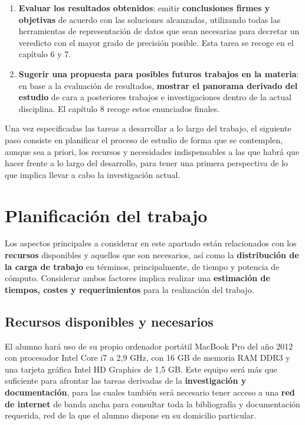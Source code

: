 \begin{enumerate}
	\item  \label{tarea6} \textbf{Evaluar los resultados obtenidos}: emitir \textbf{conclusiones firmes y objetivas} de acuerdo con las soluciones alcanzadas, utilizando todas las herramientas de representación de datos que sean necesarias para decretar un veredicto con el mayor grado de precisión posible. Esta tarea se recoge en el capítulo 6 y 7.
	
	\item  \label{tarea7} \textbf{Sugerir una propuesta para posibles futuros trabajos en la materia}: en base a la evaluación de resultados, \textbf{mostrar el panorama derivado del estudio} de cara a posteriores trabajos e investigaciones dentro de la actual disciplina. El capítulo 8 recoge estos enunciados finales.
\end{enumerate}

Una vez especificadas las tareas a desarrollar a lo largo del trabajo, el siguiente paso consiste en planificar el proceso de estudio de forma que se contemplen, aunque sea a priori, los recursos y necesidades indispensables a las que habrá que hacer frente a lo largo del desarrollo, para tener una primera perspectiva de lo que implica llevar a cabo la investigación actual.

\section{Planificación del trabajo} 

Los aspectos principales a considerar en este apartado están relacionados con los \textbf{recursos} disponibles y aquellos que son necesarios, así como la \textbf{distribución de la carga de trabajo} en términos, principalmente, de tiempo y potencia de cómputo. Considerar ambos factores implica realizar una \textbf{estimación de tiempos, costes y requerimientos} para la realización del trabajo.

\subsection{Recursos disponibles y necesarios}

El alumno hará uso de su propio ordenador portátil MacBook Pro del año 2012 con procesador Intel Core i7 a 2,9 GHz, con 16 GB de memoria RAM DDR3 y una tarjeta gráfica Intel HD Graphics de 1,5 GB. Este equipo será más que suficiente para afrontar las tareas derivadas de la \textbf{investigación y documentación}, para las cuales también será necesario tener acceso a una \textbf{red de internet} de banda ancha para consultar toda la bibliografía y documentación requerida, red de la que el alumno dispone en su domicilio particular.

